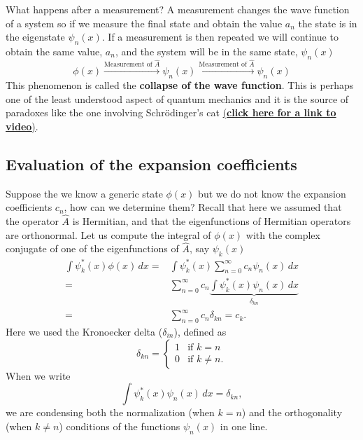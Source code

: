 \documentclass[../Main/chem331-notes.tex]{subfiles}
\begin{document}
What happens after a measurement? A measurement changes the wave function of a system so if we measure the final state and obtain the value $a_n$ the state is in the eigenstate $\psi_n(x)$.
 If a measurement is then repeated we will continue to obtain the same value, $a_n$, and the system will be in the same state, $\psi_n(x)$
\begin{equation}
\phi(x) \xrightarrow{\text{Measurement  of }\hat{A}}{} \psi_n(x) \xrightarrow{\text{Measurement  of }\hat{A}}{} \psi_n(x)
\end{equation}
 This phenomenon is called the \textbf{collapse of the wave function}.
This is perhaps one of the least understood aspect of quantum mechanics and it is the source of paradoxes like the one involving Schr\"{o}dinger's cat \href{https://ed.ted.com/lessons/schrodinger-s-cat-a-thought-experiment-in-quantum-mechanics-chad-orzel}{(\textbf{click here for a link to video})}.

\subsection{Evaluation of the expansion coefficients}
Suppose the we know a generic state $\phi(x)$ but we do not know the expansion coefficients $c_n$, how can we determine them?
Recall that here we assumed that the operator $\hat{A}$ is Hermitian, and that the eigenfunctions of Hermitian operators are orthonormal.
Let us compute the integral of $\phi(x)$ with the complex conjugate of one of the eigenfunctions of $\hat{A}$, say $\psi_k(x)$
\begin{equation}
\begin{split}
\int \psi^*_k(x) \phi(x) \, dx =& \int  \psi^*_k(x)\sum_{n = 0}^\infty c_n \psi_n(x) \, dx \\
=& \sum_{n = 0}^\infty c_n \underbrace{\int  \psi^*_k(x) \psi_n(x) \, dx}_{\delta_{kn}} \\
=& \sum_{n = 0}^\infty c_n \delta_{kn} = c_k.
\end{split}
\end{equation}
Here we used the Kronoecker delta ($\delta_{in}$), defined as
\begin{equation}
\delta_{kn} =
\begin{cases}
1 & \text{if } k = n \\
0 & \text{if } k \neq n. 
\end{cases}
\end{equation}
When we write
\begin{equation}
\int  \psi^*_k(x) \psi_n(x) \, dx = \delta_{kn},
\end{equation}
we are condensing both the normalization (when $k = n$) and the orthogonality (when $k \neq n$) conditions of the functions $\psi_n(x)$ in one line.
\end{document}
